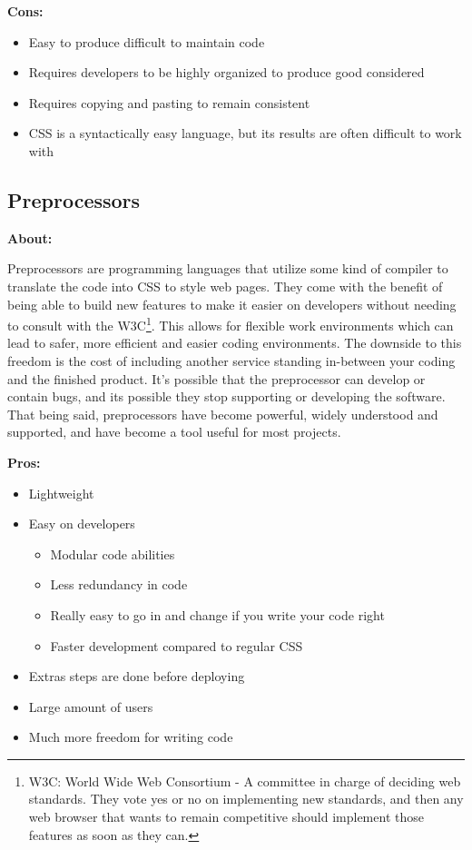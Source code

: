 \documentclass[draftclsnofoot,onecolumn,letterpaper,10pt,compsoc]{IEEEtran}
\begin{document}
    \textbf{Cons:}
    \begin{itemize}
      \item Easy to produce difficult to maintain code
      \item Requires developers to be highly organized to produce good considered
      \item Requires copying and pasting to remain consistent
      \item CSS is a syntactically easy language, but its results are often difficult to work with
    \end{itemize}

  \subsection{Preprocessors}
    \textbf{About:}

    Preprocessors are programming languages that utilize some kind of compiler to translate the code into CSS to style web pages.
    They come with the benefit of being able to build new features to make it easier on developers without needing to consult with the W3C\footnote{W3C: World Wide Web Consortium - A committee in charge of deciding web standards. They vote yes or no on implementing new standards, and then any web browser that wants to remain competitive should implement those features as soon as they can.}.
    This allows for flexible work environments which can lead to safer, more efficient and easier coding environments.
    The downside to this freedom is the cost of including another service standing in-between your coding and the finished product.
    It's possible that the preprocessor can develop or contain bugs, and its possible they stop supporting or developing the software.
    That being said, preprocessors have become powerful, widely understood and supported, and have become a tool useful for most projects.

    \textbf{Pros:}
    \begin{itemize}
      \item Lightweight
      \item Easy on developers
      \begin{itemize}
        \item Modular code abilities
        \item Less redundancy in code
        \item Really easy to go in and change if you write your code right
        \item Faster development compared to regular CSS
      \end{itemize}
      \item Extras steps are done before deploying
      \item Large amount of users
      \item Much more freedom for writing code
    \end{itemize}
\end{document}
